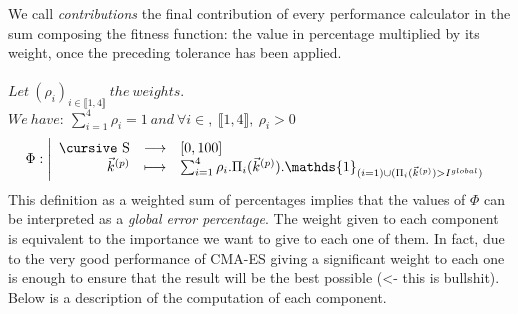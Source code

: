 We call \emph{contributions} the final contribution of every performance calculator in the sum composing the fitness function: the value in percentage multiplied by its weight, once the preceding tolerance has been applied.\\
\\ 
$Let\ (\rho_{i})_{i\in\llbracket 1,4 \rrbracket}\ the\ weights.$\\
$We\ have:\ \sum_{i=1}^{4} \rho_{i}=1\ and\ \forall i \in,\ \llbracket 1,4 \rrbracket,\ \rho_{i}>0$\\
\begin{displaymath}
		\Phi:
		\left|
  		\begin{array}{rcl}
    	\text{\cursive S} & \longrightarrow &[0,100] \\
    	\vec{k}^{(p)} & \longmapsto & \sum_{i=1}^{4}\rho_{i}.\Pi_{i}(\vec{k}^{(p)}).\mathds{1}_{(i=1)\cup(\Pi_{i}(\vec{k}^{(p)})>I^{global})}\\ 
  		\end{array}
		\right.\\
\end{displaymath}
This definition as a weighted sum of percentages implies that the values of $\Phi$ can be interpreted as a \emph{global error percentage}. The weight given to each component is equivalent to the importance we want to give to each one of them. In fact, due to the very good performance of CMA-ES giving a significant weight to each one is enough to ensure that the result will be the best possible \color{red}(<- this is bullshit)\color{black}.\\
Below is a description of the computation of each component.
